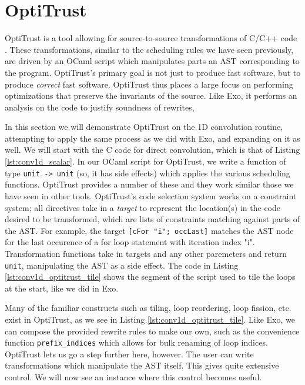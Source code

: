 \documentclass[acmsmall, nonacm=true]{acmart}
\begin{document}
\section{OptiTrust}

OptiTrust is a tool allowing for source-to-source transformations of C/C++ code \cite{chargueraud:hal-03773485}. These transformations, similar to the scheduling rules we have seen previously, are driven by an OCaml script which manipulates parts an AST corresponding to the program. OptiTrust's primary goal is not just to produce fast software, but to produce \textit{correct} fast software. OptiTrust thus places a large focus on performing optimizations that preserve the invariants of the source. Like Exo, it performs an analysis on the code to justify soundness of rewrites,

In this section we will demonstrate OptiTrust on the 1D convolution routine, attempting to apply the same process as we did with Exo, and expanding on it as well. We will start with the C code for direct convolution, which is that of Listing \ref{lst:conv1d_scalar}. In our OCaml script for OptiTrust, we write a function of type \verb|unit -> unit| (so, it has side effects) which applies the various scheduling functions. OptiTrust provides a number of these and they work similar those we have seen in other tools. OptiTrust's code selection system works on a constraint system; all directives take in a \textit{target} to represent the location(s) in the code desired to be transformed, which are lists of constraints matching against parts of the AST. For example, the target \verb|[cFor "i"; occLast]| matches the AST node for the last occurence of a for loop statement with iteration index "i". Transformation functions take in targets and any other paremeters and return \verb|unit|, manipulating the AST as a side effect. The code in Listing \ref{lst:conv1d_optitrust_tile} shows the segment of the script used to tile the loops at the start, like we did in Exo.

Many of the familiar constructs such as tiling, loop reordering, loop fission, etc.  exist in OptiTrust, as we see in Listing \ref{lst:conv1d_optitrust_tile}. Like Exo, we can compose the provided rewrite rules to make our own, such as the convenience function \verb|prefix_indices| which allows for bulk renaming of loop indices. OptiTrust lets us go a step further here, however. The user can write transformations which manipulate the AST itself. This gives quite extensive control. We will now see an instance where this control becomes useful.
\end{document}
